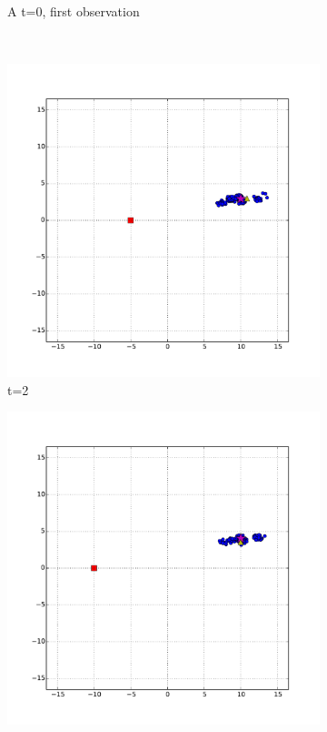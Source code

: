 \begin{figure}
\begin{subfigure}[b]{0.3\textwidth}
                \caption{A t=0, first observation}
                \label{fig:beam_bad_range_t_0}
        \end{subfigure}
        ~ %
        \begin{subfigure}[b]{0.3\textwidth}
                \includegraphics[width=\textwidth]{beam_bad_range_t_2}
                \caption{t=2}
                \label{fig:beam_bad_range_t_2}
        \end{subfigure}
        \begin{subfigure}[b]{0.3\textwidth}
                \includegraphics[width=\textwidth]{beam_bad_range_t_3}

\end{subfigure}
\end{figure}
